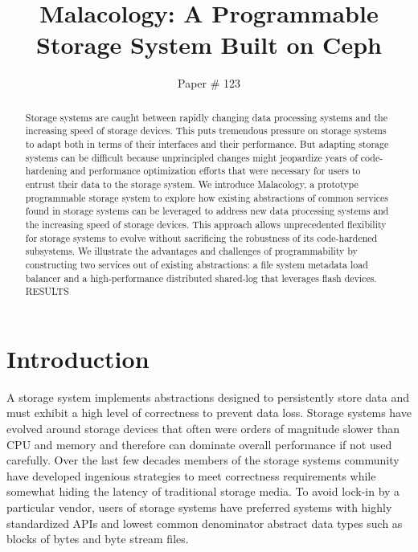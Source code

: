\documentclass[10pt,twocolumn]{article}
\begin{document}
\title{Malacology: A Programmable Storage System Built on Ceph}
\author{Paper \# 123}
\date{}
\maketitle
\thispagestyle{empty}

\begin{abstract}
Storage systems are caught between rapidly changing data processing systems and
the increasing speed of storage devices. This puts tremendous pressure on
storage systems to adapt both in terms of their interfaces and their
performance. But adapting storage systems can be difficult because unprincipled
changes might jeopardize years of code-hardening and performance optimization
efforts that were necessary for users to entrust their data to the storage
system.  We introduce  Malacology, a prototype programmable storage system to
explore how existing abstractions of common services found in storage systems
can be leveraged to address new data processing systems and the increasing
speed of storage devices. This approach allows unprecedented flexibility for
storage systems to evolve without sacrificing the robustness of its
code-hardened subsystems.  We illustrate the advantages and challenges of
programmability by constructing two services out of existing abstractions: a
file system metadata load balancer and a high-performance distributed shared-log
that leverages flash devices.  RESULTS
\end{abstract}

\section{Introduction}\label{introduction}

A storage system implements abstractions designed to persistently store
data and must exhibit a high level of correctness to prevent data loss.
Storage systems have evolved around storage devices that often were
orders of magnitude slower than CPU and memory and therefore can
dominate overall performance if not used carefully. Over the last few
decades members of the storage systems community have developed
ingenious strategies to meet correctness requirements while somewhat
hiding the latency of traditional storage media. To avoid lock-in by a
particular vendor, users of storage systems have preferred systems with
highly standardized APIs and lowest common denominator abstract data
types such as blocks of bytes and byte stream files.
\end{document}
